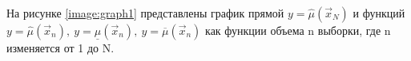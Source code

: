 На рисунке \ref{image:graph1} представлены график прямой $y = \hat\mu(\vec x_N)$ и функций \newline $y = \hat\mu(\vec x_n),\ y = \underline\mu(\vec x_n),\  y = \overline\mu(\vec x_n)$ как функции объема n выборки, где n изменяется от 1 до N.
\begin{figure}[H]
\end{figure}

